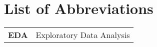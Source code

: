 
\section*{List of Abbreviations}

\begin{tabular}{ l l }
  \textbf{EDA} & Exploratory Data Analysis  \\
\end{tabular}
